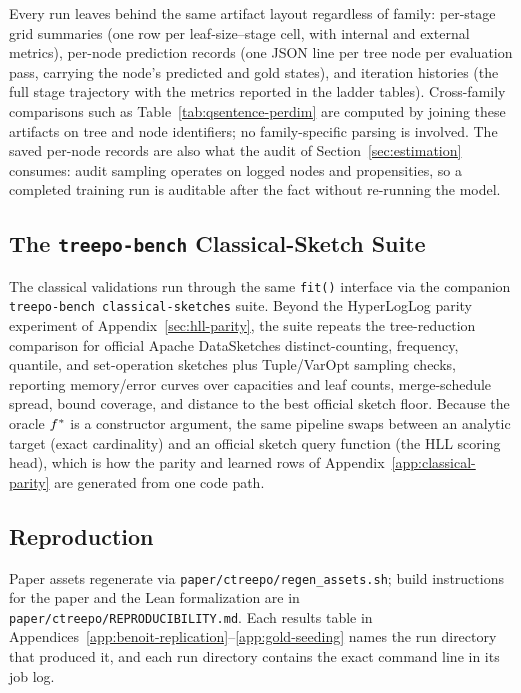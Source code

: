 Every run leaves behind the same artifact layout regardless of family:
per-stage grid summaries (one row per leaf-size--stage cell, with
internal and external metrics), per-node prediction records (one JSON
line per tree node per evaluation pass, carrying the node's predicted
and gold states), and iteration histories (the full stage trajectory
with the metrics reported in the ladder tables). Cross-family
comparisons such as Table~\ref{tab:qsentence-perdim} are computed by
joining these artifacts on tree and node identifiers; no
family-specific parsing is involved. The saved per-node records are
also what the audit of Section~\ref{sec:estimation} consumes: audit
sampling operates on logged nodes and propensities, so a completed
training run is auditable after the fact without re-running the model.

\subsection{The \texttt{treepo-bench} Classical-Sketch Suite}

The classical validations run through the same \texttt{fit()}
interface via the companion \texttt{treepo-bench classical-sketches}
suite. Beyond the HyperLogLog parity experiment of
Appendix~\ref{sec:hll-parity}, the suite repeats the tree-reduction
comparison for official Apache DataSketches distinct-counting,
frequency, quantile, and set-operation sketches plus Tuple/VarOpt
sampling checks, reporting memory/error curves over capacities and
leaf counts, merge-schedule spread, bound coverage, and distance to
the best official sketch floor. Because the oracle $f^\ast$ is a
constructor argument, the same pipeline swaps between an analytic
target (exact cardinality) and an official sketch query function
(the HLL scoring head), which is how the parity and learned rows of
Appendix~\ref{app:classical-parity} are generated from one code path.

\subsection{Reproduction}

Paper assets regenerate via \texttt{paper/ctreepo/regen\_assets.sh};
build instructions for the paper and the Lean formalization are in
\texttt{paper/ctreepo/REPRODUCIBILITY.md}. Each results table in
Appendices~\ref{app:benoit-replication}--\ref{app:gold-seeding} names
the run directory that produced it, and each run directory contains
the exact command line in its job log.
